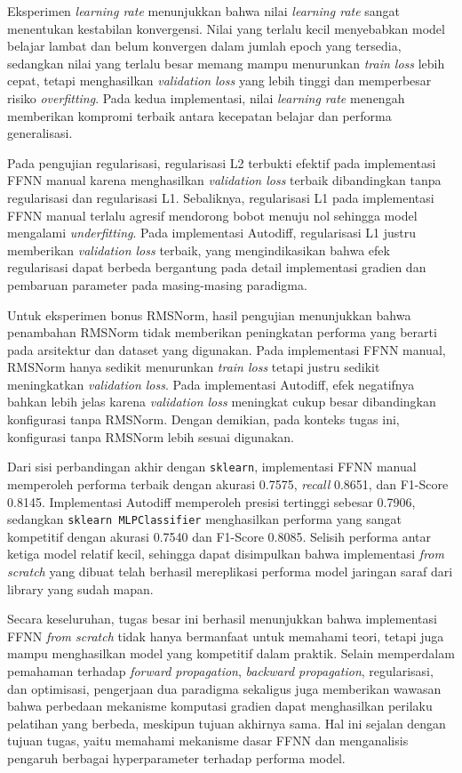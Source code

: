 Eksperimen \textit{learning rate} menunjukkan bahwa nilai \textit{learning rate} sangat menentukan kestabilan konvergensi. Nilai yang terlalu kecil menyebabkan model belajar lambat dan belum konvergen dalam jumlah epoch yang tersedia, sedangkan nilai yang terlalu besar memang mampu menurunkan \textit{train loss} lebih cepat, tetapi menghasilkan \textit{validation loss} yang lebih tinggi dan memperbesar risiko \textit{overfitting}. Pada kedua implementasi, nilai \textit{learning rate} menengah memberikan kompromi terbaik antara kecepatan belajar dan performa generalisasi.

Pada pengujian regularisasi, regularisasi L2 terbukti efektif pada implementasi FFNN manual karena menghasilkan \textit{validation loss} terbaik dibandingkan tanpa regularisasi dan regularisasi L1. Sebaliknya, regularisasi L1 pada implementasi FFNN manual terlalu agresif mendorong bobot menuju nol sehingga model mengalami \textit{underfitting}. Pada implementasi Autodiff, regularisasi L1 justru memberikan \textit{validation loss} terbaik, yang mengindikasikan bahwa efek regularisasi dapat berbeda bergantung pada detail implementasi gradien dan pembaruan parameter pada masing-masing paradigma.

Untuk eksperimen bonus RMSNorm, hasil pengujian menunjukkan bahwa penambahan RMSNorm tidak memberikan peningkatan performa yang berarti pada arsitektur dan dataset yang digunakan. Pada implementasi FFNN manual, RMSNorm hanya sedikit menurunkan \textit{train loss} tetapi justru sedikit meningkatkan \textit{validation loss}. Pada implementasi Autodiff, efek negatifnya bahkan lebih jelas karena \textit{validation loss} meningkat cukup besar dibandingkan konfigurasi tanpa RMSNorm. Dengan demikian, pada konteks tugas ini, konfigurasi tanpa RMSNorm lebih sesuai digunakan.

Dari sisi perbandingan akhir dengan \texttt{sklearn}, implementasi FFNN manual memperoleh performa terbaik dengan akurasi 0.7575, \textit{recall} 0.8651, dan F1-Score 0.8145. Implementasi Autodiff memperoleh presisi tertinggi sebesar 0.7906, sedangkan \texttt{sklearn MLPClassifier} menghasilkan performa yang sangat kompetitif dengan akurasi 0.7540 dan F1-Score 0.8085. Selisih performa antar ketiga model relatif kecil, sehingga dapat disimpulkan bahwa implementasi \textit{from scratch} yang dibuat telah berhasil mereplikasi performa model jaringan saraf dari library yang sudah mapan.

Secara keseluruhan, tugas besar ini berhasil menunjukkan bahwa implementasi FFNN \textit{from scratch} tidak hanya bermanfaat untuk memahami teori, tetapi juga mampu menghasilkan model yang kompetitif dalam praktik. Selain memperdalam pemahaman terhadap \textit{forward propagation}, \textit{backward propagation}, regularisasi, dan optimisasi, pengerjaan dua paradigma sekaligus juga memberikan wawasan bahwa perbedaan mekanisme komputasi gradien dapat menghasilkan perilaku pelatihan yang berbeda, meskipun tujuan akhirnya sama. Hal ini sejalan dengan tujuan tugas, yaitu memahami mekanisme dasar FFNN dan menganalisis pengaruh berbagai hyperparameter terhadap performa model.

